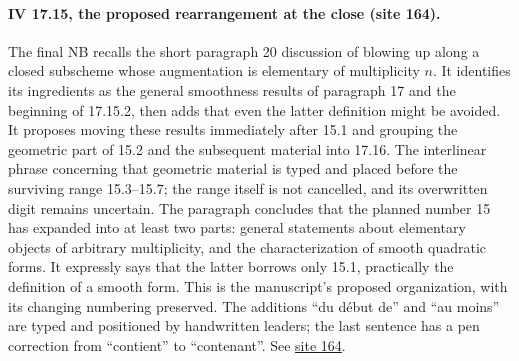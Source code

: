 \paragraph{IV 17.15, the proposed rearrangement at the close (site 164).}
The final NB recalls the short paragraph 20 discussion of blowing up along a closed subscheme whose augmentation is elementary of multiplicity $n$. It identifies its ingredients as the general smoothness results of paragraph 17 and the beginning of 17.15.2, then adds that even the latter definition might be avoided. It proposes moving these results immediately after 15.1 and grouping the geometric part of 15.2 and the subsequent material into 17.16. The interlinear phrase concerning that geometric material is typed and placed before the surviving range 15.3--15.7; the range itself is not cancelled, and its overwritten digit remains uncertain. The paragraph concludes that the planned number 15 has expanded into at least two parts: general statements about elementary objects of arbitrary multiplicity, and the characterization of smooth quadratic forms. It expressly says that the latter borrows only 15.1, practically the definition of a smooth form. This is the manuscript's proposed organization, with its changing numbering preserved. The additions ``du début de'' and ``au moins'' are typed and positioned by handwritten leaders; the last sentence has a pen correction from ``contient'' to ``contenant''. See \href{https://grothendieck.umontpellier.fr/web/viewer.html?file=../25.pdf#page=165}{site 164}.
